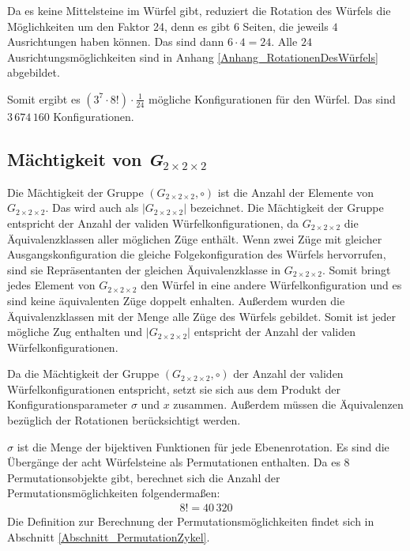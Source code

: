 \documentclass[12pt,a4paper, usenames, dvipsnames]{article}
\theoremstyle{mystyle}
\theoremstyle{definition}
\newcommand{\Gtwo}{\ensuremath{G_{2\times 2\times 2}}}
\begin{document}
Da es keine Mittelsteine im Würfel gibt, reduziert die Rotation des Würfels die Möglichkeiten um den Faktor 24, denn es gibt $6$ Seiten, die jeweils $4$ Ausrichtungen haben können. Das sind dann $6 \cdot 4 = 24$. Alle $24$ Ausrichtungsmöglichkeiten sind in Anhang \ref{Anhang_RotationenDesWürfels} abgebildet.

Somit ergibt es $(3^7 \cdot 8!) \cdot \frac{1}{24}$ mögliche Konfigurationen für den Würfel. Das sind $3\, 674\, 160$ Konfigurationen.



%
%
%
%
%
%
%
%
%
%
%
%
%
%
%
%
%
%
%

\subsection{Mächtigkeit von \textit{G}$_{2 \times  2 \times 2}$} %

\label{Abschnitt_MächtigkeitVonG}

Die Mächtigkeit der Gruppe $(\Gtwo,\circ)$ ist die Anzahl der Elemente von $\Gtwo$. Das wird auch als $|\Gtwo|$ bezeichnet. Die Mächtigkeit der Gruppe entspricht der Anzahl der validen Würfelkonfigurationen, da $\Gtwo$ die Äquivalenzklassen aller möglichen Züge enthält. Wenn zwei Züge mit gleicher Ausgangskonfiguration die gleiche Folgekonfiguration des Würfels hervorrufen, sind sie Repräsentanten der gleichen Äquivalenzklasse in $\Gtwo$. Somit bringt jedes Element von $\Gtwo$ den Würfel in eine andere Würfelkonfiguration und es sind keine äquivalenten Züge doppelt enhalten. Außerdem wurden die Äquivalenzklassen mit der Menge alle Züge des Würfels gebildet. Somit ist jeder mögliche Zug enthalten und $|\Gtwo|$ entspricht der Anzahl der validen Würfelkonfigurationen.

Da die Mächtigkeit der Gruppe $(\Gtwo,\circ)$ der Anzahl der validen Würfelkonfigurationen entspricht, setzt sie sich aus dem Produkt der Konfigurationsparameter $\sigma$ und $x$ zusammen. Außerdem müssen die Äquivalenzen bezüglich der Rotationen berücksichtigt werden.

$\sigma$ ist die Menge der bijektiven Funktionen für jede Ebenenrotation. Es sind die Übergänge der acht Würfelsteine als Permutationen enthalten. Da es $8$ Permutationsobjekte gibt, berechnet sich die Anzahl der Permutationsmöglichkeiten folgendermaßen:
\begin{align*}
8! = 40 \, 320
\end{align*}
Die Definition zur Berechnung der Permutationsmöglichkeiten findet sich in Abschnitt \ref{Abschnitt_PermutationZykel}.
\end{document}
